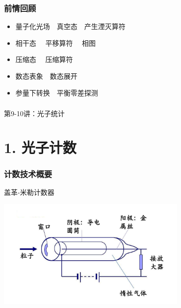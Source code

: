 

\begin{frame}
    \frametitle{前情回顾}
    \begin{itemize}
        \item 量子化光场~~真空态~~产生湮灭算符 
        \item 相干态~~ 平移算符 ~~相图
        \item 压缩态~~ 压缩算符
        \item 数态表象~~数态展开
        \item 参量下转换~~平衡零差探测 
    \end{itemize}     
\end{frame}

\begin{frame} [plain]
    \frametitle{}
    \Background[1] 
    \begin{center}
    {\huge 第9-10讲：光子统计}
    \end{center}  
    \addtocounter{framenumber}{-1}   
\end{frame}

\section{1. 光子计数}

\begin{frame}
 \frametitle{计数技术概要}
    {\Bullet} 盖革-米勒计数器
    \begin{center}
        \includegraphics[width=0.7\textwidth]{figs/16.png}
    \end{center}  
\end{frame}

